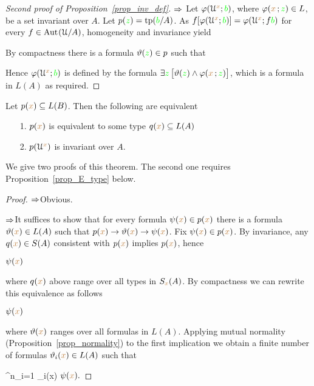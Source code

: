 \begin{proof}[Second proof of Proposition~\ref{prop_inv_def}] 
   $\Rightarrow$ 
   Let $\varphi(\EuScript U^{\color{brown} x};{\color{green} b})$, where $\varphi({\color{brown} x}\,;{\color{green} z})\in L$, be a set invariant over $A$.
   Let $p({\color{green} z})={\rm tp}({\color{green} b}/A)$.
   As $f[\varphi(\EuScript U^{\color{brown} x};{\color{green} b})]=\varphi(\EuScript U^{\color{brown} x};f{\color{green} b})$ for every $f\in{\rm Aut\kern.15ex}(\EuScript U/A)$, homogeneity and invariance yield
   

By compactness there is a formula $\vartheta({\color{green} z})\in p$ such that 


Hence  $\varphi(\EuScript U^{\color{brown} x};{\color{green} b})$ is defined by the formula $\exists {\color{green}z}\,\big[\vartheta({\color{green} z})\wedge\varphi({\color{brown} x}\,;{\color{green} z})\big]$, which is a formula in $L(A)$ as required.
\end{proof}

\begin{proposition}\label{prop_inv_types}
Let $p({\color{brown} x})\subseteq L(B)$.
Then the following are equivalent
\begin{itemize}
 \item[1.] $p({\color{brown} x})$ is equivalent to some type $q({\color{brown} x})\subseteq L(A)$
 \item[2.] $p(\EuScript U^{\color{brown} x})$ is invariant over $A$.
\end{itemize}
\end{proposition}

We give two proofs of this theorem.  The second one requires Proposition~\ref{prop_E_type} below.

\vspace*{-\parskip}
\begin{proof}
$\Rightarrow$\quad Obvious. 

$\Rightarrow$\quad It suffices to show that for every formula $\psi({\color{brown} x})\in p({\color{brown} x})$ there is a formula $\vartheta({\color{brown} x})\in L(A)$ such that $p({\color{brown} x})\rightarrow\vartheta({\color{brown} x})\rightarrow\psi({\color{brown} x})$. Fix $\psi({\color{brown} x})\in p({\color{brown} x})$. By invariance, any $q({\color{brown} x})\in S(A)$ consistent with $p({\color{brown} x})$ implies $p({\color{brown} x})$, hence

\medrel{\imp}$\psi({\color{brown} x})$

where $q({\color{brown} x})$ above range over all types in $S_{\color{brown} x}(A)$. By compactness we can rewrite this equivalence as follows

\medrel{\imp}$\psi({\color{brown} x})$

where $\vartheta({\color{brown} x})$ ranges over all formulas in $L(A)$.
Applying mutual normality (Proposition~\ref{prop_normality}) to the first implication we obtain a finite number of formulas $\vartheta_i({\color{brown} x})\in L(A)$ such that 

{\imp}
{\bigvee^n_{i=1} \theta_i({\mr x})}
\medrel{\imp}
$\psi({\color{brown} x}).$
\end{proof}

